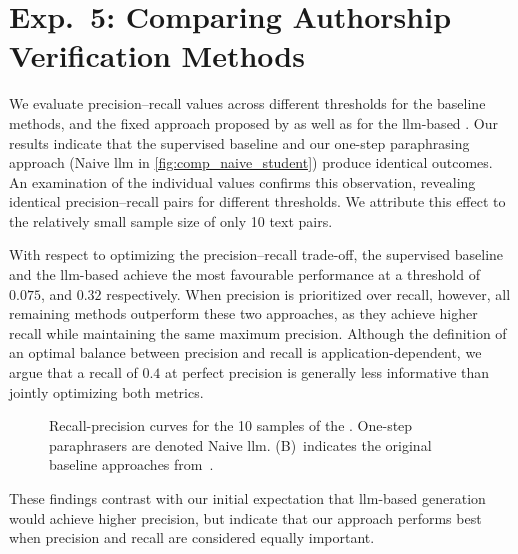 \section{Exp.\ 5: Comparing Authorship Verification Methods}%
\label{subsec:imp_gen_res}

We evaluate precision–recall values across different thresholds for the baseline methods, and the fixed approach proposed by \citet{koppel_determining_2014} as well as for the \ac{llm}-based \impAppr{}.
Our results indicate that the supervised baseline and our one-step paraphrasing approach (Naive \ac{llm} in \autoref{fig:comp_naive_student}) produce identical outcomes.
An examination of the individual values confirms this observation, revealing identical precision–recall pairs for different thresholds.
We attribute this effect to the relatively small sample size of only 10 text pairs.

With respect to optimizing the precision–recall trade-off, the supervised baseline and the \ac{llm}-based \impAppr{} achieve the most favourable performance at a threshold of $0.075$, and $0.32$ respectively.
When precision is prioritized over recall, however, all remaining methods outperform these two approaches, as they achieve higher recall while maintaining the same maximum precision.
Although the definition of an optimal balance between precision and recall is application-dependent, we argue that a recall of $0.4$ at perfect precision is generally less informative than jointly optimizing both metrics.

\begin{figure}[htbp]
    \centering
    
    \caption[Recall-precision curves for the \dataStudent{}.]{Recall-precision curves for the 10 samples of the \dataStudent{}. 
    One-step paraphrasers are denoted Naive \ac{llm}.
    (B)~indicates the original baseline approaches from~\citep{koppel_determining_2014}.
    }
    \label{fig:comp_naive_student}
\end{figure}

These findings contrast with our initial expectation that \ac{llm}-based \imp{} generation would achieve higher precision, but indicate that our approach performs best when precision and recall are considered equally important.
